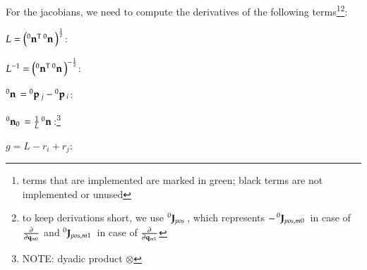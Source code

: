 For the jacobians, we need to compute the derivatives of the following terms\footnote{terms that are implemented are marked in green; black terms are not implemented or unused}\footnote{to keep derivations short, we use $\prescript{0}{}{\mathbf{J}_{pos}}\,$, which represents $-\prescript{0}{}{\mathbf{J}_{pos,m0}}\,$ in case of 
$\frac{\partial }{\partial \mathbf{q}_{m0}}$ and $\prescript{0}{}{\mathbf{J}_{pos,m1}}\,$ in case of $\frac{\partial }{\partial \mathbf{q}_{m1}}$   }:
\bi
  \item $L = \left(\prescript{0}{}{\mathbf{n}}\,\!^\mathrm{T}\prescript{0}{}{\mathbf{n}}\,\right)^\frac{1}{2}$:
  \be
  \ee
  \item $L^{-1} = \left(\prescript{0}{}{\mathbf{n}}\,\!^\mathrm{T}\prescript{0}{}{\mathbf{n}}\,\right)^{-\frac{1}{2}}$:
  \be
  \ee
  \item $\prescript{0}{}{\mathbf{n}}\, = \prescript{0}{}{\mathbf{p}}\,_{j} - \prescript{0}{}{\mathbf{p}}\,_{i}$:
  \be
  \ee
  \item $\prescript{0}{}{\mathbf{n}_0}\, = \frac{1}{L} \prescript{0}{}{\mathbf{n}}\,$:\footnote{NOTE: 
  dyadic product $\otimes$}
  \be
  \ee
  \item $g = L - r_i + r_j$:
  \be
  \ee
